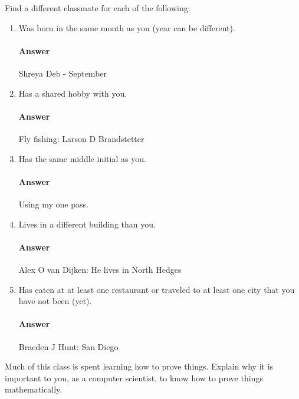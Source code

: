 \documentclass{article}
\begin{document}
Find a different classmate for each of the following:
\begin{enumerate}
    \item Was born in the same month as you (year can be different).
        \paragraph{Answer}Shreya Deb - September

    \item Has a shared hobby with you.
        \paragraph{Answer}Fly fishing: Larson D Brandstetter

    \item Has the same middle initial as you.
        \paragraph{Answer}Using my one pass.

    \item Lives in a different building than you.
        \paragraph{Answer}Alex O van Dijken: He lives in North Hedges

    \item Has eaten at at least one restaurant or traveled to at least one city that you have not been
        (yet).
        \paragraph{Answer}Braeden J Hunt: San Diego

\end{enumerate}


Much of this class is spent learning how to prove things.  Explain why it is
important to you, as a computer scientist, to know how to prove things
mathematically.
\end{document}
